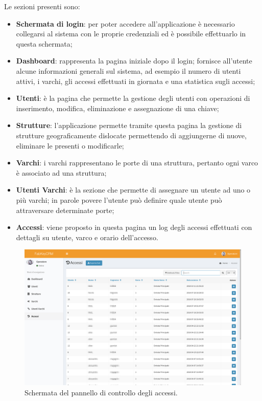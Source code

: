 Le sezioni presenti sono:
\begin{itemize}
\item \textbf{Schermata di login}: per poter accedere all'applicazione è necessario collegarsi al sistema con le proprie credenziali ed è possibile effettuarlo in questa schermata;
\item \textbf{Dashboard}: rappresenta la pagina iniziale dopo il login; fornisce all'utente alcune informazioni generali sul sistema, ad esempio il numero di utenti attivi, i varchi, gli accessi effettuati in giornata e una statistica sugli accessi;
\item \textbf{Utenti}: è la pagina che permette la gestione degli utenti con operazioni di inserimento, modifica, eliminazione e assegnazione di una chiave;
\item \textbf{Strutture}: l'applicazione permette tramite questa pagina la gestione di strutture geograficamente dislocate permettendo di aggiungerne di nuove, eliminare le presenti o modificarle;
\item \textbf{Varchi}: i varchi rappresentano le porte di una struttura, pertanto ogni varco è associato ad una struttura;
\item \textbf{Utenti Varchi}: è la sezione che permette di assegnare un utente ad uno o più varchi; in parole povere l'utente può definire quale utente può attraversare determinate porte;
\item \textbf{Accessi}: viene proposto in questa pagina un log degli accessi effettuati con dettagli su utente, varco e orario dell'accesso.
\end{itemize}

\begin{figure}[H]
	\begin{center}
	\includegraphics[scale=0.32]{immagini/accessi_crm.png}
	\caption{Schermata del pannello di controllo degli accessi.}
	\end{center}
\end{figure}

